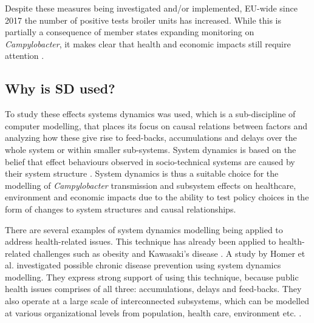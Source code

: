 Despite these measures being investigated and/or implemented, EU-wide since 2017 the number of positive tests broiler units has increased. While this is partially a consequence of member states expanding monitoring on \textit{Campylobacter}, it makes clear that health and economic impacts still require attention \parencite{nastasijevic_european_2020}.

\subsection*{Why is SD used?}

To study these effects systems dynamics was used, which is a sub-discipline of computer modelling, that places its focus on causal relations between factors and analyzing how these give rise to feed-backs, accumulations and delays over the whole system or within smaller sub-systems. System dynamics is based on the belief that effect behaviours observed in socio-technical systems are caused by their system structure \parencite{pruyt_triple_2013}. System dynamics is thus a suitable choice for the modelling of \textit{Campylobacter} transmission and subsystem effects on healthcare, environment and economic impacts due to the ability to test policy choices in the form of changes to system structures and causal relationships.

There are several examples of system dynamics modelling being applied to address health-related issues. This technique has already been applied to health-related challenges such as obesity \parencite{chen_obesity_2018} and Kawasaki's disease \parencite{huang_epidemiology_2013}. 
A study by Homer et al. investigated possible chronic disease prevention using system dynamics modelling. They express strong support of using this technique, because public health issues comprises of all three: accumulations, delays and feed-backs. They also operate at a large scale of interconnected subsystems, which can be modelled at various organizational levels from population, health care, environment etc. \parencite{homer_system_2006}. 






